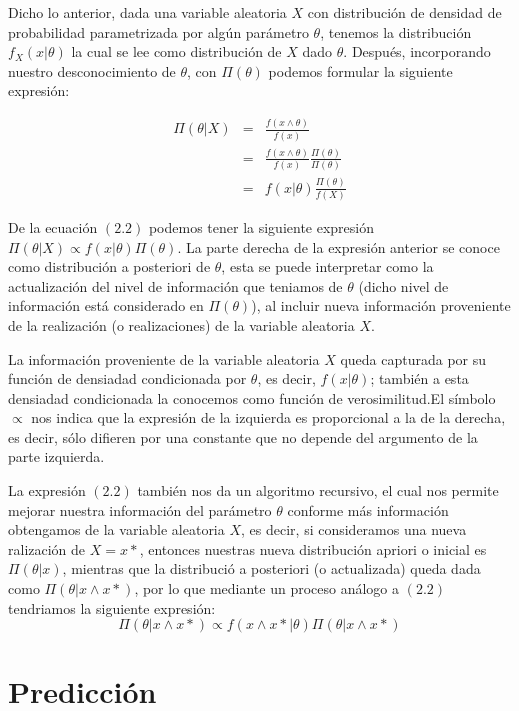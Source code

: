 Dicho lo anterior, dada una variable aleatoria $X$ con distribución de densidad de probabilidad parametrizada por algún parámetro $\theta$, tenemos la distribución $f_{X}(x|\theta)$ la cual se lee como distribución de $X$ dado $\theta$. Después, incorporando nuestro desconocimiento de $\theta$, con $\Pi(\theta)$ podemos formular la siguiente expresión:

\begin{eqnarray}
	\Pi(\theta|X)&=&\frac{f(x \wedge \theta)}{f(x)}\nonumber\\
	&=&\frac{f(x \wedge \theta)}{f(x)} \frac{\Pi(\theta)}{\Pi(\theta)}\nonumber\\
	&=&f(x|\theta)\frac{\Pi(\theta)}{f(X)}
\end{eqnarray}

De la ecuación $(2.2)$ podemos tener la siguiente expresión $\Pi(\theta|X) \propto f(x|\theta)\Pi (\theta)$. La parte derecha de la expresión anterior se conoce como distribución a posteriori de $\theta$, esta se puede interpretar como la actualización del nivel de información que teniamos de $\theta$ (dicho nivel de información está considerado en $\Pi(\theta)$), al incluir nueva información proveniente de la realización (o realizaciones) de la variable aleatoria $X$. 

La información proveniente de la variable aleatoria $X$ queda capturada por su función de densiadad condicionada por $\theta$, es decir, $f(x|\theta)$; también a esta densiadad condicionada la conocemos como función de verosimilitud.El símbolo $\propto$ nos indica que la expresión de la izquierda es proporcional a la de la derecha, es decir, sólo difieren por una constante que no depende del argumento de la parte izquierda.

La expresión $(2.2)$ también nos da un algoritmo recursivo, el cual nos permite mejorar nuestra información del parámetro $\theta$ conforme más información obtengamos de la variable aleatoria $X$, es decir, si consideramos una nueva ralización de $X=x*$, entonces nuestras nueva distribución apriori o inicial es $\Pi(\theta|x)$, mientras que la distribució a posteriori (o actualizada) queda dada como $\Pi(\theta|x \wedge x*)$, por lo que mediante un proceso análogo a $(2.2)$ tendriamos la siguiente expresión:
\begin{equation}
	\Pi(\theta|x \wedge x*)\propto f(x\wedge x*|\theta) \Pi(\theta|x \wedge x*)
\end{equation}

\section{Predicción}

